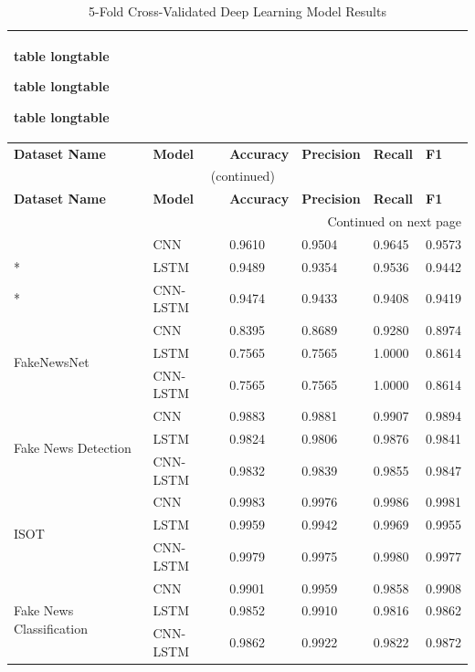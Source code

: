 \documentclass[stu,12pt,floatsintext,donotrepeattitle]{apa7}
\makeatletter
\let\origcaption\caption
\newcommand{\@tabletype}{table}
\newcommand{\@longtabletype}{longtable}
\DeclareRobustCommand{\caption}[2][]{%
    \ifx\relax#1\relax
      \origcaption{#2}%
      \def\temp@cap{#2}%
    \else
      \origcaption[#1]{#2}%
      \def\temp@cap{#1}%
    \fi
    \ifx\@captype\@tabletype
      \ifx\@currenvir\@longtabletype\else
        \addcontentsline{lot}{table}{\protect\numberline{\thetable}{\ignorespaces\temp@cap}}%
      \fi
    \fi
  }%
\let\oldcaption\caption
\renewcommand{\caption}[2][]{%
    \oldcaption[#1]{#2}%
    \vspace{-12pt}%
  }%
\makeatother
\begin{document}
\begingroup
\setlength{\tabcolsep}{3pt}
\renewcommand{\arraystretch}{1.3}
\setlength\LTleft{\fill}
\setlength\LTright{\fill}
\begin{longtable}{@{} p{4.7cm} p{2.0cm} p{1.7cm} p{1.7cm} p{1.7cm} p{1.7cm} @{}}
\caption{5-Fold Cross-Validated Deep Learning Model Results} \label{tab:dl_results} \\
\toprule
\textbf{Dataset Name} & \textbf{Model} & \textbf{Accuracy} & \textbf{Precision} & \textbf{Recall} & \textbf{F1} \\
\midrule
\endfirsthead

\multicolumn{6}{c}{\normalsize\tablename\ \thetable{} (continued)} \\
\toprule
\textbf{Dataset Name} & \textbf{Model} & \textbf{Accuracy} & \textbf{Precision} & \textbf{Recall} & \textbf{F1} \\
\midrule
\endhead

\bottomrule
\multicolumn{6}{r}{{Continued on next page}} \\
\endfoot

\bottomrule
\endlastfoot
\multirow{3}{*}{WELFake} & CNN & 0.9610 & 0.9504 & 0.9645 & 0.9573 \\*
 & LSTM & 0.9489 & 0.9354 & 0.9536 & 0.9442 \\*
 & CNN-LSTM & 0.9474 & 0.9433 & 0.9408 & 0.9419 \\
\midrule
\multirow{3}{*}{FakeNewsNet} & CNN & 0.8395 & 0.8689 & 0.9280 & 0.8974 \\*
 & LSTM & 0.7565 & 0.7565 & 1.0000 & 0.8614 \\*
 & CNN-LSTM & 0.7565 & 0.7565 & 1.0000 & 0.8614 \\
\midrule
\multirow{3}{*}{Fake News Detection} & CNN & 0.9883 & 0.9881 & 0.9907 & 0.9894 \\*
 & LSTM & 0.9824 & 0.9806 & 0.9876 & 0.9841 \\*
 & CNN-LSTM & 0.9832 & 0.9839 & 0.9855 & 0.9847 \\
\midrule
\multirow{3}{*}{ISOT} & CNN & 0.9983 & 0.9976 & 0.9986 & 0.9981 \\*
 & LSTM & 0.9959 & 0.9942 & 0.9969 & 0.9955 \\*
 & CNN-LSTM & 0.9979 & 0.9975 & 0.9980 & 0.9977 \\
\midrule
\multirow{3}{*}{Fake News Classification} & CNN & 0.9901 & 0.9959 & 0.9858 & 0.9908 \\*
 & LSTM & 0.9852 & 0.9910 & 0.9816 & 0.9862 \\*
 & CNN-LSTM & 0.9862 & 0.9922 & 0.9822 & 0.9872 \\
\end{longtable}
\endgroup
\end{document}
